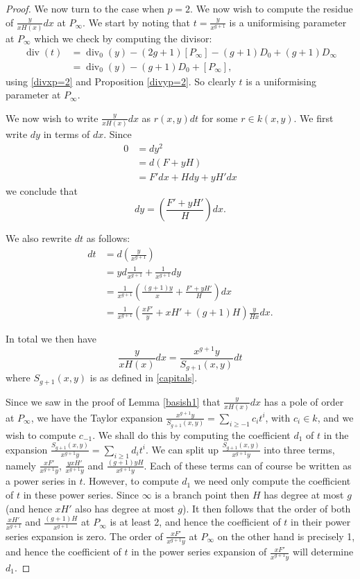 \documentclass[draft, 11pt]{article} %
\theoremstyle{plain}
\theoremstyle{remark}
\DeclareMathOperator{\di}{div}
\begin{document}
\begin{proof}
We now turn to the case when $p=2$.
We now wish to compute the residue of $\frac{y}{xH(x)}dx$ at $P_\infty$.
We start by noting that $t = \frac{y}{x^{g+1}}$ is a uniformising parameter at $P_\infty$ which we check by computing the divisor:
\begin{align*}
\di(t) & = \di_0(y) - (2g+1)[P_\infty] -(g+1)D_0 + (g+1)D_\infty \\
& = \di_0(y)-(g+1)D_0 + [P_\infty],
\end{align*}
using \eqref{divxp=2} and Proposition \ref{divyp=2}.
So clearly $t$ is a uniformising parameter at $P_\infty$.

We now wish to write $\frac{y}{xH(x)}dx$ as $r(x,y)dt$ for some $r \in k(x,y)$.
We first write $dy$ in terms of $dx$.
Since
\begin{align*}
0 & =  dy^2 \\
& =  d(F+yH) \\
& =  F'dx + Hdy + yH'dx
\end{align*}
we conclude that
\[
dy = \left( \frac{F'+yH'}{H} \right) dx.
\]

We also rewrite $dt$ as follows:
\begin{align*}
dt & =  d\left( \frac{y}{x^{g+1}} \right) \\
& =  yd\frac{1}{x^{g+1}} + \frac{1}{x^{g+1}}dy \\
& =  \frac{1}{x^{g+1}} \left( \frac{(g+1)y}{x} + \frac{F'+yH'}{H} \right) dx \\
& =  \frac{1}{x^{g+1}} \left( \frac{xF'}{y} + xH' + (g+1)H \right) \frac{y}{Hx} dx.
\end{align*}

In total we then have
\[
\frac{y}{xH(x)}dx = \frac{x^{g+1}y}{S_{g+1}(x,y)}dt
\]
where $S_{g+1}(x,y)$ is as defined in \eqref{capitals}.

Since we saw in the proof of Lemma \ref{basish1} that $\frac{y}{xH(x)}dx$ has a pole of order at $P_\infty$, we have the Taylor expansion $\frac{x^{g+1}y}{S_{g+1}(x,y)} = \sum_{i\geq -1} c_i t^i$, with $c_i \in k$, and we wish to compute $c_{-1}$.
We shall do this by computing the coefficient $d_1$ of $t$ in the expansion $\frac{S_{g+1}(x,y)}{x^{g+1}y} = \sum_{i\geq 1}d_it^i$.
We can split up $\frac{S_{g+1}(x,y)}{x^{g+1}y}$ into three terms, namely $\frac{xF'}{x^{g+1}y}$, $\frac{yxH'}{x^{g+1}y}$ and $\frac{(g+1)yH}{x^{g+1}y}$.
Each of these terms can of course be written as a power series in $t$.
However, to compute $d_1$ we need only compute the coefficient of $t$ in these power series.
Since $\infty$ is a branch point then $H$ has degree at most $g$ (and hence $xH'$ also has degree at most $g$).
It then follows that the order of both $\frac{xH'}{x^{g+1}}$ and $\frac{(g+1)H}{x^{g+1}}$ at $P_\infty$ is at least 2, and hence the coefficient of $t$ in their power series expansion is zero.
The order of $\frac{xF'}{x^{g+1}y}$ at $P_\infty$ on the other hand is precisely 1, and hence the coefficient of $t$ in the power series expansion of $\frac{xF'}{x^{g+1}y}$ will determine $d_1$.



\end{proof}
\end{document}
